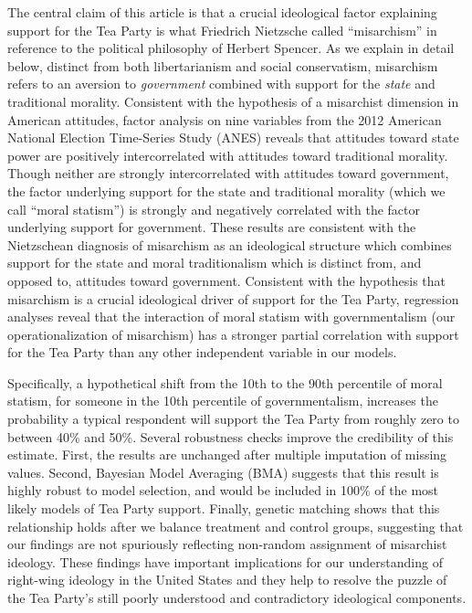 \documentclass[12pt,]{article}
\begin{document}
The central claim of this article is that a crucial ideological factor
explaining support for the Tea Party is what Friedrich Nietzsche called
``misarchism'' in reference to the political philosophy of Herbert
Spencer. As we explain in detail below, distinct from both
libertarianism and social conservatism, misarchism refers to an aversion
to \emph{government} combined with support for the \emph{state} and
traditional morality. Consistent with the hypothesis of a misarchist
dimension in American attitudes, factor analysis on nine variables from
the 2012 American National Election Time-Series Study (ANES) reveals
that attitudes toward state power are positively intercorrelated with
attitudes toward traditional morality. Though neither are strongly
intercorrelated with attitudes toward government, the factor underlying
support for the state and traditional morality (which we call ``moral
statism'') is strongly and negatively correlated with the factor
underlying support for government. These results are consistent with the
Nietzschean diagnosis of misarchism as an ideological structure which
combines support for the state and moral traditionalism which is
distinct from, and opposed to, attitudes toward government. Consistent
with the hypothesis that misarchism is a crucial ideological driver of
support for the Tea Party, regression analyses reveal that the
interaction of moral statism with governmentalism (our
operationalization of misarchism) has a stronger partial correlation
with support for the Tea Party than any other independent variable in
our models.

Specifically, a hypothetical shift from the 10th to the 90th percentile
of moral statism, for someone in the 10th percentile of governmentalism,
increases the probability a typical respondent will support the Tea
Party from roughly zero to between 40\% and 50\%. Several robustness
checks improve the credibility of this estimate. First, the results are
unchanged after multiple imputation of missing values. Second, Bayesian
Model Averaging (BMA) suggests that this result is highly robust to
model selection, and would be included in 100\% of the most likely
models of Tea Party support. Finally, genetic matching shows that this
relationship holds after we balance treatment and control groups,
suggesting that our findings are not spuriously reflecting non-random
assignment of misarchist ideology. These findings have important
implications for our understanding of right-wing ideology in the United
States and they help to resolve the puzzle of the Tea Party's still
poorly understood and contradictory ideological components.
\end{document}
